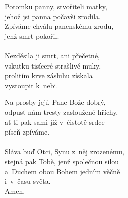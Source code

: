 \begin{translatioMulticol}{2}
Potomku panny, stvořiteli matky,\\
jehož jsi panna počavši zrodila.\\
Zpíváme chválu panenskému zrodu,\\
jenž smrt pokořil.\\
\\
Nezděsila ji smrt, ani přečetné,\\
vskutku tisíceré strašlivé muky,\\
prolitím krve zásluhu získala\\
vystoupit k~nebi.\columnbreak

Na prosby její, Pane Bože dobrý,\\
odpusť nám tresty zasloužené hříchy,\\
ať ti pak sami již v~čistotě srdce\\
píseň zpíváme.\\
\\
Sláva buď Otci, Synu z~něj zrozenému,\\
stejná pak Tobě, jenž společnou silou\\
a~Duchem obou Bohem jedním věčně\\
i~v~času světa.\\
Amen.
\end{translatioMulticol}
